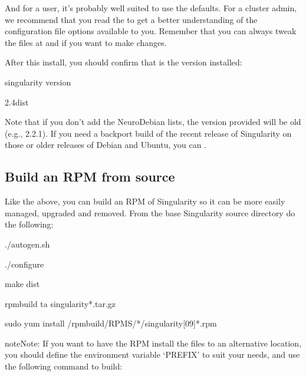 \documentclass[letterpaper,10pt,english]{sphinxmanual}
\begin{document}
And for a user, it’s probably well suited to use the defaults. For a cluster admin, we recommend that you read the  to get a better understanding of the configuration file options available to you. Remember that you can always tweak the files at  and  if you want to make changes.

After this install, you should confirm that  is the version installed:

%
\begin{sphinxVerbatim}[commandchars=\\\{\}]
\PYGZdl{} singularity \PYGZhy{}\PYGZhy{}version

  2.4\PYGZhy{}dist
\end{sphinxVerbatim}

Note that if you don’t add the NeuroDebian lists, the version provided will be old (e.g., 2.2.1). If you need a backport build of the recent release of Singularity on those or older releases of Debian and Ubuntu, you can .


\subsection{Build an RPM from source}
\label{\detokenize{installation:build-an-rpm-from-source}}
Like the above, you can build an RPM of Singularity so it can be more easily managed, upgraded and removed. From the base Singularity source directory do the following:

%
\begin{sphinxVerbatim}[commandchars=\\\{\}]
./autogen.sh

./configure

make dist

rpmbuild \PYGZhy{}ta singularity\PYGZhy{}*.tar.gz

sudo yum install \PYGZti{}/rpmbuild/RPMS/*/singularity\PYGZhy{}[0\PYGZhy{}9]*.rpm
\end{sphinxVerbatim}

\begin{sphinxadmonition}{note}{Note:}
If you want to have the RPM install the files to an alternative location, you should define the environment variable ‘PREFIX’ to suit your needs, and use the following command to build:
\end{sphinxadmonition}
\end{document}
